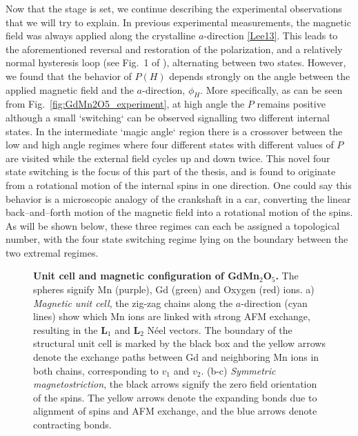 Now that the stage is set, we continue describing the experimental observations that we will try to explain. In previous experimental measurements, the magnetic field was always applied along the crystalline $a$-direction \ref{Lee13}. This leads to the aforementioned reversal and restoration of the polarization, and a relatively normal hysteresis loop (see Fig.~1 of \cite{Lee13}), alternating between two states. However, we found that the behavior of $P(H)$ depends strongly on the angle between the applied magnetic field and the $a$-direction, $\phi_H$.
More specifically, as can be seen from Fig.~\ref{fig:GdMn2O5_experiment}, at high angle the $P$ remains positive although a small `switching` can be observed signalling two different internal states. In the intermediate `magic angle` region there is a crossover between the low and high angle regimes where four different states with different values of $P$ are visited while the external field cycles up and down twice.
This novel four state switching is the focus of this part of the thesis, and is found to originate from a rotational motion of the internal spins in one direction. One could say this behavior is a microscopic analogy of the crankshaft in a car, converting the linear back--and--forth motion of the magnetic field into a rotational motion of the spins.
As will be shown below, these three regimes can each be assigned a topological number, with the four state switching regime lying on the boundary between the two extremal regimes. 

\begin{figure}
	\caption{\label{fig:GdMn2O5_unit_cell}{\bf Unit cell and magnetic configuration of GdMn$_2$O$_5$.} The spheres signify Mn (purple), Gd (green) and Oxygen (red) ions. a) {\it Magnetic unit cell}, the zig-zag chains along the $a$-direction (cyan lines) show which Mn ions are linked with strong AFM exchange, resulting in the $\mathbf{L}_1$ and $\mathbf{L}_2$ N\'eel vectors. The boundary of the structural unit cell is marked by the black box and the yellow arrows denote the exchange paths between Gd and neighboring Mn ions in both chains, corresponding to $v_1$ and $v_2$. (b-c) {\it Symmetric magnetostriction}, the black arrows signify the zero field orientation of the spins. The yellow arrows denote the expanding bonds due to alignment of spins and AFM exchange, and the blue arrows denote contracting bonds.}
\end{figure}
